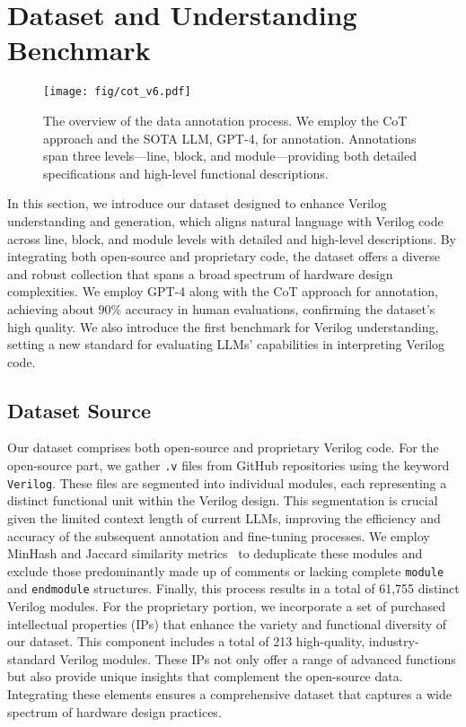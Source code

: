 \section{Dataset and Understanding Benchmark}
\begin{figure}[ht]
    \centering
    \texttt{[image: fig/cot\_v6.pdf]}
    \vspace{-12pt}
    \caption{The overview of the data annotation process. We employ the CoT approach and the SOTA LLM, GPT-4, for annotation. Annotations span three levels—line, block, and module—providing both detailed specifications and high-level functional descriptions.}
    \label{fig:cot}
\end{figure}
In this section, we introduce our dataset designed to enhance Verilog understanding and generation, which aligns natural language with Verilog code across line, block, and module levels with detailed and high-level descriptions.
By integrating both open-source and proprietary code, the dataset offers a diverse and robust collection that spans a broad spectrum of hardware design complexities.
We employ GPT-4 along with the CoT approach for annotation, achieving about $90\%$ accuracy in human evaluations, confirming the dataset's high quality.
We also introduce the first benchmark for Verilog understanding, setting a new standard for evaluating LLMs' capabilities in interpreting Verilog code.





\subsection{Dataset Source}
Our dataset comprises both open-source and proprietary Verilog code. For the open-source part, we gather \texttt{.v} files from GitHub repositories using the keyword \texttt{Verilog}.
These files are segmented into individual modules, each representing a distinct functional unit within the Verilog design.
This segmentation is crucial given the limited context length of current LLMs, improving the efficiency and accuracy of the subsequent annotation and fine-tuning processes.
We employ MinHash and Jaccard similarity metrics~\citep{yan2017privmin} to deduplicate these modules and exclude those predominantly made up of comments or lacking complete \texttt{module} and \texttt{endmodule} structures.
Finally, this process results in a total of 61,755 distinct Verilog modules.
For the proprietary portion, we incorporate a set of purchased intellectual properties (IPs) that enhance the variety and functional diversity of our dataset. This component includes a total of 213 high-quality, industry-standard Verilog modules. These IPs not only offer a range of advanced functions but also provide unique insights that complement the open-source data. Integrating these elements ensures a comprehensive dataset that captures a wide spectrum of hardware design practices.


